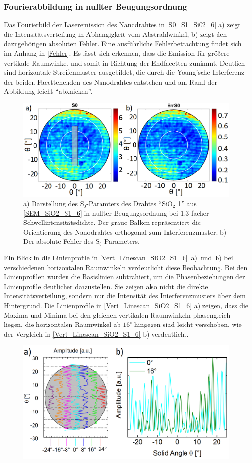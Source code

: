 \subsubsection{Fourierabbildung in nullter Beugungsordnung}
Das Fourierbild der Laseremission des Nanodrahtes in \autoref{S0_S1_Si02_6} a) zeigt die Intensitätsverteilung in Abhängigkeit vom Abstrahlwinkel, b) zeigt den dazugehörigen absoluten Fehler. Eine ausführliche Fehlerbetrachtung findet sich im Anhang in \autoref{Fehler}. Es lässt sich erkennen, dass die Emission für größere vertikale Raumwinkel und somit in Richtung der Endfacetten zunimmt. Deutlich sind horizontale Streifenmuster ausgebildet, die durch die Young'sche Interferenz der beiden Facettenenden des Nanodrahtes entstehen und am Rand der Abbildung leicht ``abknicken''.\begin{figure}[h]
\centering
\includegraphics[width=.55\textwidth]{Bilder/SiO2/S0_S1_Si02_6}
\caption{a) Darstellung des S$_\text{0}$-Paramters des Drahtes ``SiO$_\text{2}$ 1'' aus \autoref{SEM_SiO2_S1_6} in nullter Beugungsordnung bei 1.3-facher Schwellintensitätsdichte. Der graue Balken repräsentiert die Orientierung des Nanodrahtes orthogonal zum Interferenzmuster. b) Der absolute Fehler des S$_\text{0}$-Parameters.}
\label{S0_S1_Si02_6}
\end{figure} Ein Blick in die Linienprofile in \mbox{\autoref{Vert_Linescan_SiO2_S1_6} a) und b)} bei verschiedenen horizontalen Raumwinkeln verdeutlicht diese Beobachtung. Bei den Linienprofilen wurden die Basislinien subtrahiert, um die Phasenbeziehungen der Linienprofile deutlicher darzustellen. Sie zeigen also nicht die direkte Intensitätsverteilung, sondern nur die Intensität des Interferenzmusters über dem Hintergrund. Die Linienprofile in \autoref{Vert_Linescan_SiO2_S1_6} a) zeigen, dass die Maxima und Minima bei den gleichen vertikalen Raumwinkeln phasengleich liegen, die horizontalen Raumwinkel ab $\text{16}^\circ$ hingegen sind leicht verschoben, wie der Vergleich in \autoref{Vert_Linescan_SiO2_S1_6} b) verdeutlicht.\begin{figure}[b]
\includegraphics[width=.7\textwidth]{Bilder/SiO2/Vert_Linescan_SiO2_S1_6}

\end{figure}
